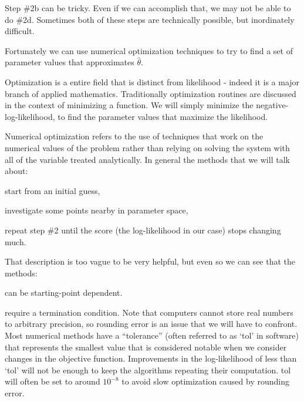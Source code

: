 \documentclass[11pt]{article}
\begin{document}
Step \#2b can be tricky. Even if we can accomplish that, we may not be able to do \#2d.
Sometimes both of these steps are technically possible, but inordinately difficult.

Fortunately we can use numerical optimization techniques to try to find a set of parameter values that approximates $\hat\theta$.

Optimization is a entire field that is distinct from likelihood - indeed it is a major branch of applied mathematics.
Traditionally optimization routines are discussed in the context of minimizing a function.  
We will simply minimize the negative-log-likelihood, to find the parameter values that maximize the likelihood.

Numerical optimization refers to the use of techniques that work on the numerical values of the problem rather than relying on solving the system with all of the variable treated analytically.
In general the methods that we will talk about:
\begin{compactenum}
	\item start from an initial guess,
	\item investigate some points nearby in parameter space,
	\item repeat step \#2 until the score (the log-likelihood in our case) stops changing much.
\end{compactenum}
That description is too vague to be very helpful, but even so we can see that the methods:
\begin{compactenum}
	\item can be starting-point dependent.
	\item require a termination condition.  Note that computers cannot store real numbers to arbitrary precision, so rounding error is an issue that we will have to confront.  Most numerical methods have a ``tolerance'' (often referred to as `tol' in software) that represents the smallest value that is considered notable when we consider changes in the objective function. Improvements in the log-likelihood of less than `tol' will not be enough to keep the algorithms repeating their computation. tol will often be set to around $10^{-8}$ to avoid slow optimization caused by rounding error.
\end{compactenum}
\end{document}
